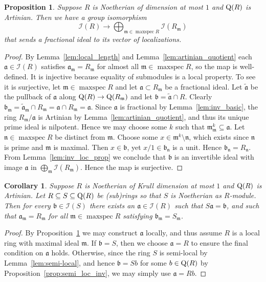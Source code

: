 \documentclass{amsart}
\theoremstyle{plain}
\newtheorem{proposition}[theorem]{Proposition}
\newtheorem{corollary}[theorem]{Corollary}
\theoremstyle{definition}
\DeclareMathOperator{\maxspec}{maxspec}
\newcommand{\m}{\ensuremath{\mathfrak{m}}}
\newcommand{\fm}{\ensuremath{\mathfrak{m}}}
\newcommand{\fn}{\ensuremath{\mathfrak{n}}}
\begin{document}
\begin{proposition}\label{prop:invertibility_defined_locally}
Suppose \(R\) is Noetherian of dimension at most \(1\) and \(\textup{Q}(R)\) is Artinian. 
Then we have a group isomorphism
\[ \mathcal{I}(R)\to\bigoplus_{\m\in\maxspec R} \mathcal{I}(R_\mathfrak{m}) \]
that sends a fractional ideal to its vector of localizations. 
\end{proposition}
\begin{proof}
By Lemma~\ref{lem:local_length} and Lemma~\ref{lem:artinian_quotient} each \(\mathfrak{a}\in\mathcal{I}(R)\) satisfies \(\mathfrak{a}_\mathfrak{m}=R_\mathfrak{m}\) for almost all \(\m\in\maxspec R\), so the map is well-defined.
It is injective because equality of submodules is a local property.
To see it is surjective, let \(\fm\in\maxspec R\) and let \(\mathfrak{a}\subset R_\fm\) be a fractional ideal. Let \(\tilde{\mathfrak{a}}\) be the pullback of \(\mathfrak{a}\) along \(\textup{Q}(R)\to\textup{Q}(R_\fm)\) and let \(\mathfrak{b}=\tilde{\mathfrak{a}}\cap R\). Clearly \(\mathfrak{b}_\fm=\tilde{\mathfrak{a}}_\fm \cap R_\fm = \mathfrak{a} \cap R_\fm = \mathfrak{a}\). 
Since \(\mathfrak{a}\) is fractional by Lemma~\ref{lem:inv_basic}, the ring \(R_\fm/\mathfrak{a}\) is Artinian by Lemma~\ref{lem:artinian_quotient}, and thus its unique prime ideal is nilpotent.
Hence we may choose some \(k\) such that \(\fm_\fm^k\subseteq\mathfrak{a}\).
Let \(\fn\in\maxspec R\) be distinct from \(\fm\). 
Choose some \(x\in \fm^k\setminus\fn\), which exists since \(\fn\) is prime and \(\fm\) is maximal.
Then \(x\in \mathfrak{b}\), yet \(x/1\in \mathfrak{b}_\fn\) is a unit. Hence \(\mathfrak{b}_\fn=R_\fn\).
From Lemma~\ref{lem:inv_loc_prop} we conclude that \(\mathfrak{b}\) is an invertible ideal with image \(\mathfrak{a}\) in \(\bigoplus_{\m} \mathcal{I}(R_\m)\). Hence the map is surjective.
\end{proof}

\begin{corollary}\label{cor:invertible_descent}
Suppose \(R\) is Noetherian of Krull dimension at most \(1\) and \(\textup{Q}(R)\) is Artinian. Let \(R\subseteq S\subseteq \textup{Q}(R)\) be (sub)rings so that \(S\) is Noetherian as \(R\)-module. Then for every \(\mathfrak{b}\in\mathcal{I}(S)\) there exists an \(\mathfrak{a}\in\mathcal{I}(R)\) such that \(S\mathfrak{a}=\mathfrak{b}\), and such that \(\mathfrak{a}_\m=R_\m\) for all \(\m\in\maxspec R\) satisfying \(\mathfrak{b}_\m=S_\m\). %
\end{corollary}
\begin{proof}
By Proposition~\ref{prop:invertibility_defined_locally} we may construct \(\mathfrak{a}\) locally, and thus assume \(R\) is a local ring with maximal ideal \(\fm\). 
If $\mathfrak{b}=S$, then we choose $\mathfrak{a}=R$ to ensure the final condition on $\mathfrak{a}$ holds.
Otherwise, since the ring \(S\) is semi-local by Lemma~\ref{lem:semi-local}, and hence \(\mathfrak{b}=Sb\) for some \(b\in\textup{Q}(R)\) by Proposition~\ref{prop:semi_loc_inv}, we may simply use \(\mathfrak{a}=Rb\).
\end{proof}
\end{document}
